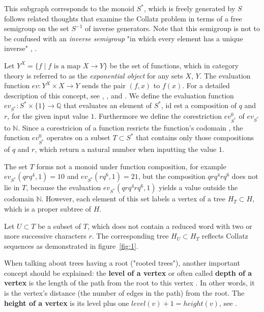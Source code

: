 \par\medskip
This subgraph corresponds to the monoid $S^*$, which is freely generated
by $S$ follows related thoughts \cite{Ref_Truemper_2014} that examine
the Collatz problem in terms of a free semigroup on the set $S^{-1}$ of
inverse generators. Note that this semigroup is not to be confused with an
\textit{inverse semigroup} "in which every element has a unique inverse"
\cite[p.~26]{Ref_Almeida}, \cite[p.~22]{Ref_Loeh}.

\par\medskip
Let $Y^X=\{f\mid f\text{ is a map }X\rightarrow Y\}$ be the set of functions, which in category theory is referred to as the \textit{exponential object} for any sets $X$, $Y$. The evaluation function $ev:Y^X\times X\to Y$ sends the pair $(f,x)$ to $f(x)$. For a detailed description of this concept, see \cite[p.~127]{Ref_Johnsonbaugh}, \cite[p.~155]{Ref_MacLane_Birkhoff}, \cite[p.~54]{Ref_Novak_etal} and \cite[p.~188]{Ref_Pellissier}. We define the evaluation function $ev_{S^*}:S^*\times\{1\}\rightarrow\mathbb{Q}$ that evaluates an element of $S^*$, id est a composition of $q$ and $r$, for the given input value $1$. Furthermore we define the corestriction ${ev^0_{S^*}}$ of $ev_{S^*}$ to $\mathbb{N}$. Since a corestricion of a function resricts the function's codomain \cite[p.~3]{Ref_Helemskii}, the function $ev^0_{S^*}$ operates on a subset $T\subset S^*$ that contains only those compositions of $q$ and $r$, which return a natural number when inputting the value $1$.

\par\medskip
The set $T$ forms not a monoid under function composition, for example $ev_{S^*}(qrq^4,1)=10$ and $ev_{S^*}(rq^6,1)=21$, but the composition $qrq^4rq^6$ does not lie in $T$, because the evaluation $ev_{S^*}(qrq^4rq^6,1)$ yields a value outside the codomain $\mathbb{N}$. However, each element of this set labels a vertex of a tree $H_{T}\subset H$, which is a proper subtree of $H$.

\par\medskip
Let $U\subset T$ be a subset of $T$, which does not contain a reduced word with two or more successive characters $r$. The corresponding tree $H_{U}\subset H_{T}$ reflects Collatz sequences as demonstrated in figure~\ref{fig:1}.

\begin{remark}
When talking about trees having a root ("rooted trees"), another important concept should be explained: the \textbf{level of a vertex} or often called \textbf{depth of a vertex} is the length of the path from the root to this vertex \cite[p.~804]{Ref_Rosen}. In other words, it is the vertex's distance (the number of edges in the path) from the root. The \textbf{height of a vertex} is its level plus one $level(v)+1=height(v)$, see \cite[p.~169]{Ref_Makinson}.
\end{remark}

